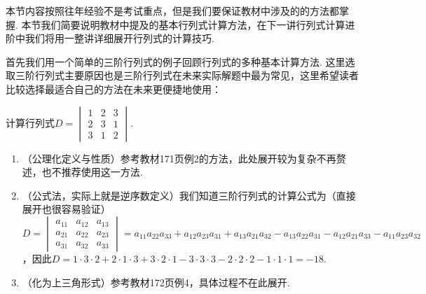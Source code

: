 本节内容按照往年经验不是考试重点，但是我们要保证教材中涉及的的方法都掌握. 本节我们简要说明教材中提及的基本行列式计算方法，在下一讲行列式计算进阶中我们将用一整讲详细展开行列式的计算技巧.

首先我们用一个简单的三阶行列式的例子回顾行列式的多种基本计算方法. 这里选取三阶行列式主要原因也是三阶行列式在未来实际解题中最为常见，这里希望读者比较选择最适合自己的方法在未来更便捷地使用：
\begin{example}
    计算行列式$D=\begin{vmatrix}
            1 & 2 & 3 \\
            2 & 3 & 1 \\
            3 & 1 & 2
        \end{vmatrix}$.
\end{example}

\begin{solution}
    \begin{enumerate}
        \item （公理化定义与性质）参考教材171页例2的方法，此处展开较为复杂不再赘述，也不推荐使用这一方法.

        \item （公式法，实际上就是逆序数定义）我们知道三阶行列式的计算公式为（直接展开也很容易验证）$D=\begin{vmatrix}
                      a_{11} & a_{12} & a_{13} \\
                      a_{21} & a_{22} & a_{23} \\
                      a_{31} & a_{32} & a_{33}
                  \end{vmatrix}=a_{11}a_{22}a_{33}+a_{12}a_{23}a_{31}+a_{13}a_{21}a_{32}-a_{13}a_{22}a_{31}-a_{12}a_{21}a_{33}-a_{11}a_{23}a_{32}$，因此$D=1 \cdot 3 \cdot 2+2 \cdot 1 \cdot 3+3 \cdot 2 \cdot 1-3 \cdot 3 \cdot 3-2 \cdot 2 \cdot 2-1 \cdot 1 \cdot 1=-18$.

        \item （化为上三角形式）参考教材172页例4，具体过程不在此展开.


\end{enumerate}
\end{solution}
